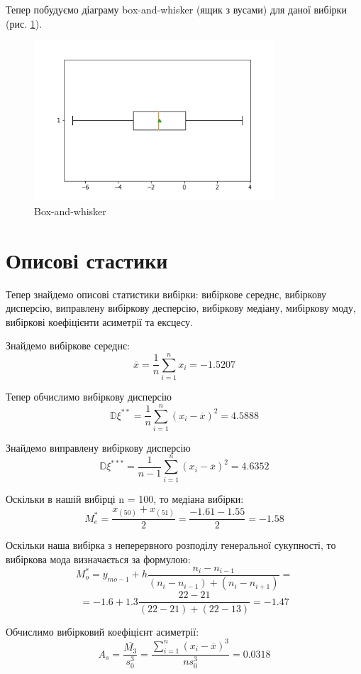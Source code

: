 \documentclass[14pt, a4paper, ukrainian]{extreport}
\begin{document}
	Тепер побудуємо діаграму box-and-whisker (ящик з вусами) для даної вибірки (рис. \ref{im:box_and_whisker}).
		\begin{figure}[H]
		\centering
		\includegraphics[width=0.8\textwidth]{./Image/Box_and_whisker.png}
		\caption{Box-and-whisker}
		\label{im:box_and_whisker}
	\end{figure}	
	
	\chapter{Описові стастики}
	Тепер знайдемо описові статистики вибірки: вибіркове середнє, вибіркову дисперсію, виправлену вибіркову десперсію, вибіркову медіану, мибіркову моду, вибіркові коефіцієнти асиметрії та ексцесу.
	
	Знайдемо вибіркове середнє:
	$$ \overline{x} = \frac{1}{n}\sum_{i=1}^{n}x_i = -1.5207$$
	
	Тепер обчислимо вибіркову дисперсію
	$$ \mathbb{D}\xi^{**} = \frac{1}{n}\sum_{i=1}^{n}(x_i - \overline{x})^2 = 4.5888$$
	
	Знайдемо виправлену вибіркову дисперсію
	$$ \mathbb{D}\xi^{***} = \frac{1}{n-1}\sum_{i=1}^{n}(x_i - \overline{x})^2 = 4.6352$$
	
	Оскільки в нашій вибірці n = 100, то медіана вибірки:
	$$ M_e^* = \frac{x_{(50)} + x_{(51)}}{2} = \frac{-1.61 - 1.55}{2} = -1.58$$
	
	Оскільки наша вибірка з неперервного розподілу генеральної сукупності, то вибіркова мода визначається за формулою:
	$$ M_o^* = y_{mo-1} + h \frac{n_i - n_{i-1}}{(n_i - n_{i-1}) + (n_i - n_{i+1})} = $$
	$$ = -1.6 + 1.3\frac{22 - 21}{(22 - 21) + (22 - 13)} = - 1.47$$

	Обчислимо вибірковий коефіцієнт асиметрії:
	$$ A_s = \frac{\overline{M_3}}{s_0^3} = \frac{\sum_{i=1}^{n}(x_i - \overline{x})^3}{ns_0^3} = 0.0318$$
	
\end{document}
